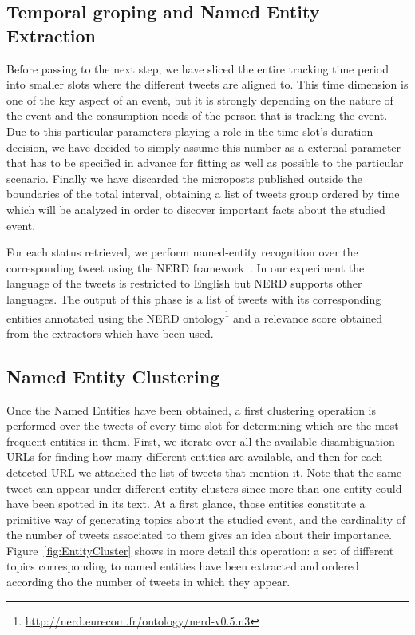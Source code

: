 \documentclass{sig-alternate}
\begin{document}
\subsection{Temporal groping and Named Entity Extraction}

Before passing to the next step, we have sliced the entire tracking time period into smaller slots where the different tweets are aligned to. This time dimension is one of the key aspect of an event, but it is strongly depending on the nature of the event and the consumption needs of the person that is tracking the event. Due to this particular parameters playing a role in the time slot's duration decision, we have decided to simply assume this number as a external parameter that has to be specified in advance for fitting as well as possible to the particular scenario. Finally we have discarded the microposts published outside the boundaries of the total interval, obtaining a list of tweets group ordered by time which will be analyzed in order to discover important facts about the studied event.

For each status retrieved, we perform named-entity recognition over the corresponding tweet using the NERD framework~\cite{Rizzo2012}. In our experiment the language of the tweets is restricted to English but NERD supports other languages. The output of this phase is a list of tweets with its corresponding entities annotated using the NERD ontology\footnote{\fontsize{8pt}{1em}\selectfont \url{http://nerd.eurecom.fr/ontology/nerd-v0.5.n3}} and a relevance score obtained from the extractors which have been used. 

\subsection{Named Entity Clustering }
\label{sec:expansion}

Once the Named Entities have been obtained, a first clustering operation is performed over the tweets of every time-slot for determining which are the most frequent entities in them. First, we iterate over all the available disambiguation URLs for finding how many different entities are available, and then for each detected URL we attached the list of tweets that mention it. Note that the same tweet can appear under different entity clusters since more than one entity could have been spotted in its text. At a first glance, those entities constitute a primitive way of generating topics about the studied event, and the cardinality of the number of tweets associated to them gives an idea about their importance. Figure~\ref{fig:EntityCluster} shows in more detail this operation: a set of different topics corresponding to named entities have been extracted and ordered according tho the number of tweets in which they appear.
\end{document}
